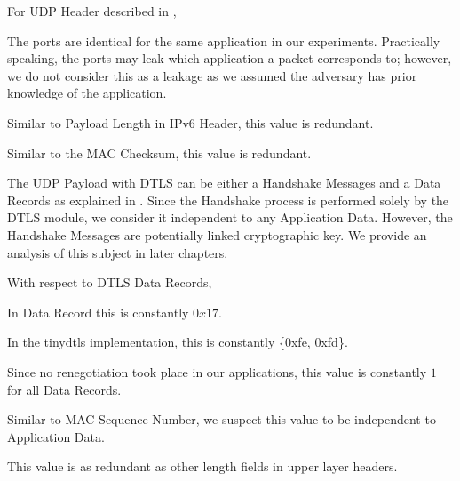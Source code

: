For UDP Header described in ,

\begin{description}[style=nextline]
	\item[Source and Destination Port]
	The ports are identical for the same application in our experiments. Practically speaking, the ports may leak which application a packet corresponds to; however, we do not consider this as a leakage as we assumed the adversary has prior knowledge of the application.
	\item[Payload Length]
	Similar to Payload Length in IPv6 Header, this value is redundant.
	\item[Checksum]
	Similar to the MAC Checksum, this value is redundant.
\end{description}

The UDP Payload with DTLS can be either a Handshake Messages and a Data Records as explained in  . Since the Handshake process is performed solely by the DTLS module, we consider it independent to any Application Data. However,  the Handshake Messages are potentially linked cryptographic key. We provide an analysis of this subject in later chapters.

With respect to DTLS Data Records,

\begin{description}[style=nextline]
	\item[Content Type]
	In Data Record this is constantly $0x17$.
	\item[Protocol Version]
	In the tinydtls implementation, this is constantly \{0xfe, 0xfd\}.
	\item[Epoch]
	Since no renegotiation took place in our applications, this value is constantly $1$ for all Data Records.
	\item[Sequence Number]
	Similar to MAC Sequence Number, we suspect this value to be independent to Application Data.
	\item[Length]
	This value is as redundant as other length fields in upper layer headers.
\end{description}
